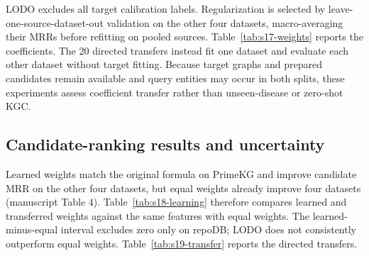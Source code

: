 \begin{revisionblock}
\par{}\noindent\begin{minipage}{\linewidth}

\centering\small
{}
\label{tab:s16-native}


\end{minipage}\par\medskip

LODO excludes all target calibration labels. Regularization is selected by leave-one-source-dataset-out validation on the other four datasets, macro-averaging their MRRs before refitting on pooled sources. Table~\ref{tab:s17-weights} reports the coefficients. The 20 directed transfers instead fit one dataset and evaluate each other dataset without target fitting. Because target graphs and prepared candidates remain available and query entities may occur in both splits, these experiments assess coefficient transfer rather than unseen-disease or zero-shot KGC.

\par{}\noindent\begin{minipage}{\linewidth}

\centering\small
{}
\label{tab:s17-weights}


\end{minipage}\par\medskip

\subsection{Candidate-ranking results and uncertainty}
Learned weights match the original formula on PrimeKG and improve candidate MRR on the other four datasets, but equal weights already improve four datasets (manuscript Table 4). Table~\ref{tab:s18-learning} therefore compares learned and transferred weights against the same features with equal weights. The learned-minus-equal interval excludes zero only on repoDB; LODO does not consistently outperform equal weights. Table~\ref{tab:s19-transfer} reports the directed transfers.


\end{revisionblock}
